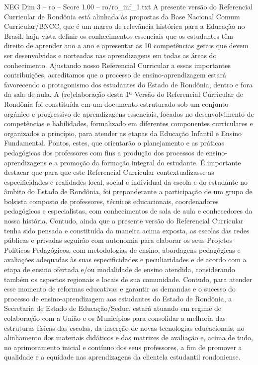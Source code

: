 \begin{textsample}{NEG Dim 3 – ro – Score 1.00 – ro/ro\_inf\_1.txt}  \label{ex:f3_neg_153}
A presente versão do Referencial Curricular de Rondônia está alinhada às propostas da Base Nacional Comum Curricular/BNCC, que é um marco de relevância histórica para a Educação no Brasil, haja vista definir os conhecimentos essenciais que os estudantes têm direito de aprender ano a ano e apresentar as 10 competências gerais que devem ser desenvolvidas e norteadas nas aprendizagens em todas as áreas do conhecimento.
Ajustando nosso Referencial Curricular a essas importantes contribuições, acreditamos que o processo de ensino-aprendizagem estará favorecendo o protagonismo dos estudantes do Estado de Rondônia, dentro e fora da sala de aula.
A (re)elaboração desta 1ª Versão do Referencial Curricular de Rondônia foi constituída em um documento estruturado sob um conjunto orgânico e progressivo de aprendizagens essenciais, focados no desenvolvimento de competências e habilidades, formalizado em diferentes componentes curriculares e organizados a princípio, para atender as etapas da Educação Infantil e Ensino Fundamental.
Pontos, estes, que orientarão o planejamento e as práticas pedagógicas dos professores com fins a produção dos processos de ensino-aprendizagens e a promoção da formação integral do estudante.
É importante destacar que para que este Referencial Curricular contextualizasse as especificidades e realidades local, social e individual da escola e do estudante no âmbito do Estado de Rondônia, foi preponderante a participação de um grupo de bolsista composto de professores, técnicos educacionais, coordenadores pedagógicos e especialistas, com conhecimentos de sala de aula e conhecedores da nossa história.
Contudo, ainda que a presente versão do Referencial Curricular tenha sido pensada e constituída da maneira acima exposta, as escolas das redes públicas e privadas seguirão com autonomia para elaborar os seus Projetos Políticos Pedagógicos, com metodologias de ensino, abordagens pedagógicas e avaliações adequadas às suas especificidades e peculiaridades e de acordo com a etapa de ensino ofertada e/ou modalidade de ensino atendida, considerando também os aspectos regionais e locais de sua comunidade.
Contudo, para atender esse momento de reformas educativas e garantir as demandas e o sucesso do processo de ensino-aprendizagem aos estudantes do Estado de Rondônia, a Secretaria de Estado de Educação/Seduc, estará atuando em regime de colaboração com a União e os Municípios para consolidar a melhoria das estruturas físicas das escolas, da inserção de novas tecnologias educacionais, no alinhamento dos materiais didáticos e das matrizes de avaliação e, acima de tudo, no aprimoramento inicial e contínuo dos seus professores, a fim de promover a qualidade e a equidade nas aprendizagens da clientela estudantil rondoniense.

\end{textsample}
